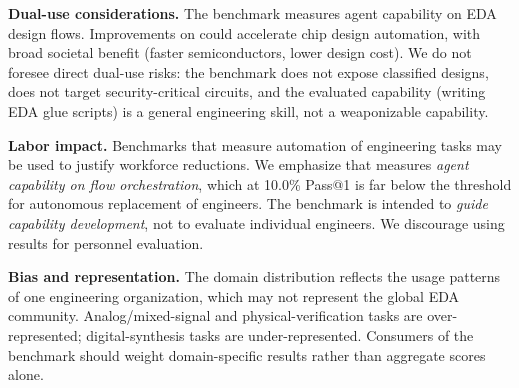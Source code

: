 \textbf{Dual-use considerations.} The benchmark measures agent capability on EDA design flows. Improvements on \bench{} could accelerate chip design automation, with broad societal benefit (faster semiconductors, lower design cost). We do not foresee direct dual-use risks: the benchmark does not expose classified designs, does not target security-critical circuits, and the evaluated capability (writing EDA glue scripts) is a general engineering skill, not a weaponizable capability.

\textbf{Labor impact.} Benchmarks that measure automation of engineering tasks may be used to justify workforce reductions. We emphasize that \bench{} measures \emph{agent capability on flow orchestration}, which at 10.0\% Pass@1 is far below the threshold for autonomous replacement of engineers. The benchmark is intended to \emph{guide capability development}, not to evaluate individual engineers. We discourage using \bench{} results for personnel evaluation.

\textbf{Bias and representation.} The domain distribution reflects the usage patterns of one engineering organization, which may not represent the global EDA community. Analog/mixed-signal and physical-verification tasks are over-represented; digital-synthesis tasks are under-represented. Consumers of the benchmark should weight domain-specific results rather than aggregate scores alone.
